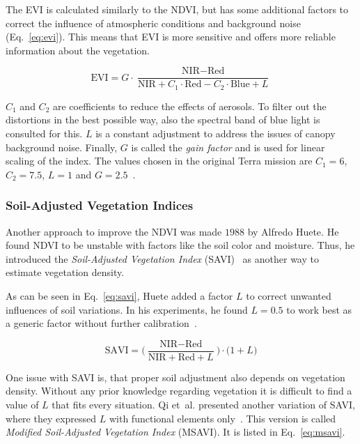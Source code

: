The EVI is calculated similarly to the NDVI, but has some additional factors to correct the influence of atmospheric conditions and background noise (Eq.~\ref{eq:evi}). This means that EVI is more sensitive and offers more reliable information about the vegetation.

\begin{equation}
    \text{EVI} = G \cdot \frac{
    \text{NIR}-\text{Red}
    }{
    \text{NIR} + C_1 \cdot \text{Red} - C_2 \cdot \text{Blue} + L
    }
    \label{eq:evi}
\end{equation}

$C_1$ and $C_2$ are coefficients to reduce the effects of aerosols. To filter out the distortions in the best possible way, also the spectral band of blue light is consulted for this. $L$ is a constant adjustment to address the issues of canopy background noise. Finally, $G$ is called the \emph{gain factor} and is used for linear scaling of the index. The values chosen in the original Terra mission are $C_1=6$, $C_2=7.5$, $L=1$ and $G=2.5$~\cite{modis2002}.

\subsubsection{Soil-Adjusted Vegetation Indices}
Another approach to improve the NDVI was made $1988$ by Alfredo Huete. He found NDVI to be unstable with factors like the soil color and moisture. Thus, he introduced the \emph{Soil-Adjusted Vegetation Index} (SAVI)~\cite{savi88} as another way to estimate vegetation density.

As can be seen in Eq.~\ref{eq:savi}, Huete added a factor $L$ to correct unwanted influences of soil variations. In his experiments, he found $L=0.5$ to work best as a generic factor without further calibration~\cite{savi88}.

\begin{equation}
    \displaystyle
    \text{SAVI} =
    \bigg(
    \frac{\text{NIR} - \text{Red}}
    {\text{NIR} + \text{Red} + L}
    \bigg) \cdot \big(1 + L \big)
    \label{eq:savi}
\end{equation}

One issue with SAVI is, that proper soil adjustment also depends on vegetation density. Without any prior knowledge regarding vegetation it is difficult to find a value of $L$ that fits every situation. Qi et~al. presented another variation of SAVI, where they expressed $L$ with functional elements only~\cite{msavi94}. This version is called \emph{Modified Soil-Adjusted Vegetation Index} (MSAVI). It is listed in Eq.~\ref{eq:msavi}.

